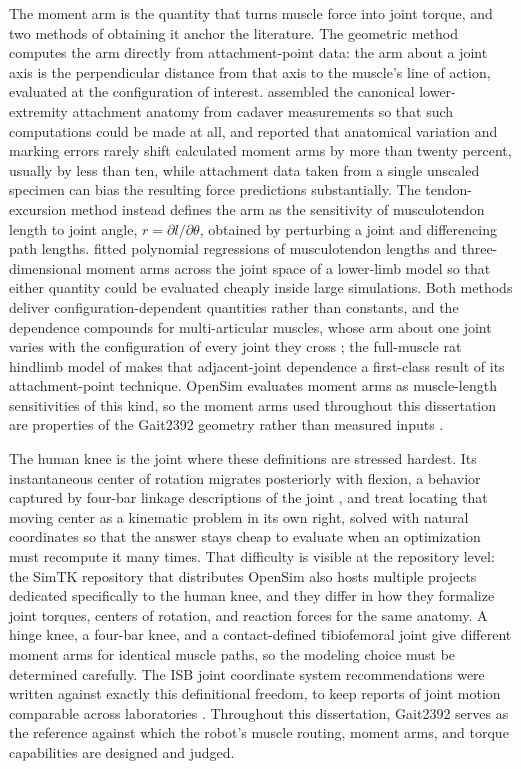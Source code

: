 The moment arm is the quantity that turns muscle force into joint torque, and two methods of obtaining it anchor the literature. The geometric method computes the arm directly from attachment-point data: the arm about a joint axis is the perpendicular distance from that axis to the muscle's line of action, evaluated at the configuration of interest. \citet{brand_model_1982} assembled the canonical lower-extremity attachment anatomy from cadaver measurements so that such computations could be made at all, and reported that anatomical variation and marking errors rarely shift calculated moment arms by more than twenty percent, usually by less than ten, while attachment data taken from a single unscaled specimen can bias the resulting force predictions substantially. The tendon-excursion method instead defines the arm as the sensitivity of musculotendon length to joint angle, $r = \partial l/\partial\theta$, obtained by perturbing a joint and differencing path lengths. \citet{menegaldo_moment_2004} fitted polynomial regressions of musculotendon lengths and three-dimensional moment arms across the joint space of a lower-limb model so that either quantity could be evaluated cheaply inside large simulations. Both methods deliver configuration-dependent quantities rather than constants, and the dependence compounds for multi-articular muscles, whose arm about one joint varies with the configuration of every joint they cross \citep{zajac_determining_1989, young_analyzing_2019}; the full-muscle rat hindlimb model of \citet{young_analyzing_2019} makes that adjacent-joint dependence a first-class result of its attachment-point technique. OpenSim evaluates moment arms as muscle-length sensitivities of this kind, so the moment arms used throughout this dissertation are properties of the Gait2392 geometry rather than measured inputs \citep{delp_opensim_2007, seth_opensim_2018}.

The human knee is the joint where these definitions are stressed hardest. Its instantaneous center of rotation migrates posteriorly with flexion, a behavior captured by four-bar linkage descriptions of the joint \citep{romero_four-bar_2020, steele_biomimetic_2018}, and \citet{romero_four-bar_2020} treat locating that moving center as a kinematic problem in its own right, solved with natural coordinates so that the answer stays cheap to evaluate when an optimization must recompute it many times. That difficulty is visible at the repository level: the SimTK repository that distributes OpenSim also hosts multiple projects dedicated specifically to the human knee, and they differ in how they formalize joint torques, centers of rotation, and reaction forces for the same anatomy. A hinge knee, a four-bar knee, and a contact-defined tibiofemoral joint give different moment arms for identical muscle paths, so the modeling choice must be determined carefully. The ISB joint coordinate system recommendations were written against exactly this definitional freedom, to keep reports of joint motion comparable across laboratories \citep{wu_isb_2002}. Throughout this dissertation, Gait2392 serves as the reference against which the robot's muscle routing, moment arms, and torque capabilities are designed and judged.

